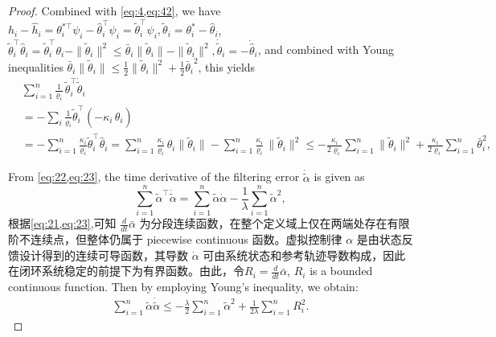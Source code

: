\documentclass[pdflatex,sn-mathphys-num]{sn-jnl}%
\theoremstyle{thmstyleone}%
\theoremstyle{thmstyletwo}%
\theoremstyle{thmstylethree}%
\begin{document}
\begin{proof}
Combined with \cref{eq:4,eq:42}, we have $h_i-\hat h_i=\theta_{i}^{*\top}\psi_i-\hat \theta_{i}^{\top}\psi_i    
=\tilde \theta_{i}^{\!\top}\psi_i, \tilde \theta_{i}=\theta_{i}^{*}-\hat \theta_{i}$, $\tilde \theta_{i}^\top\hat \theta_{i}   =\tilde \theta_{i}^\top \theta_{i}- \|\tilde \theta_{i}\|^2
\le \bar \theta_{i}\|\tilde \theta_{i}\| - \|\tilde \theta_{i}\|^2, \dot{\tilde \theta}_i=-\dot{\hat \theta}_i$, and combined with Young inequalities $\bar \theta_{i}\|\tilde \theta_{i}\| \le \frac12\|\tilde \theta_{i}\|^{2}
	+\frac12{\bar \theta_{i}}^{2}$, this yields
	\begin{equation}\label{eq:47}
		\begin{aligned}
				&\sum_{i=1}^{n}
					\frac{1}{\varrho_i}\,\tilde \theta_{i}^{\top}\dot{\tilde \theta}_i \\
					&= 
					-\sum_{i}
					\frac{1}{\varrho_i}\tilde \theta_{i}^{\top}
					\left(
						 - \kappa_i\,\hat{\theta}_i
					\right)                                                   \\
					 &= -\sum_{i=1}^{n}\frac{\kappa_i}{\varrho_i}\tilde \theta_{i}^{\top}\hat \theta_{i}        =\sum_{i=1}^n \frac{\kappa_i}{\varrho_i}\,\theta_{i}\|\tilde \theta_{i}\|
				- \sum_{i=1}^n \frac{\kappa_i}{\varrho_i}\,\|\tilde \theta_{i}\|^2 \le
				- \frac{\kappa_i}{2\varrho_i}\sum_{i=1}^n \|\tilde \theta_{i}\|^2+\frac{\kappa_i}{2\varrho_i}\sum_{i=1}^n \bar \theta_{i}^2,		
			\end{aligned}
		\end{equation}

From \cref{eq:22,eq:23}, the time derivative of the filtering error $\dot{\tilde{\alpha}}$ is given as
\begin{equation}\label{eq:48}
	\sum_{i=1}^{n}\tilde\alpha^\top \dot{\tilde \alpha}= \sum_{i=1}^{n}{\tilde{\alpha}}\dot{\alpha}-\frac{1}{\lambda}\sum_{i=1}^{n}{\tilde{\alpha}}^2,
\end{equation}
根据\cref{eq:21,eq:23},可知 $\frac{d}{dt} \bar{\alpha}$ 为分段连续函数，在整个定义域上仅在两端处存在有限阶不连续点，但整体仍属于 piecewise continuous 函数。虚拟控制律 $\alpha$ 是由状态反馈设计得到的连续可导函数，其导数 $\dot{\alpha}$ 可由系统状态和参考轨迹导数构成，因此在闭环系统稳定的前提下为有界函数。由此，令$R_i=\frac{d}{dt} \bar{\alpha}$, $R_i$ is a bounded continuous function.
Then by employing Young's inequality, we obtain:
\begin{equation}\label{eq:49}
	\begin{aligned}
		\sum_{i=1}^{n}{\tilde{\alpha}}\dot{\tilde{\alpha}}\leq -\frac{\lambda}{2} \sum_{i=1}^{n} {\tilde{\alpha}}^{2} + \frac{1}{2\lambda} \sum_{i=1}^{n}R_{i}^2. 
	\end{aligned}
\end{equation}






\end{proof}
\end{document}
